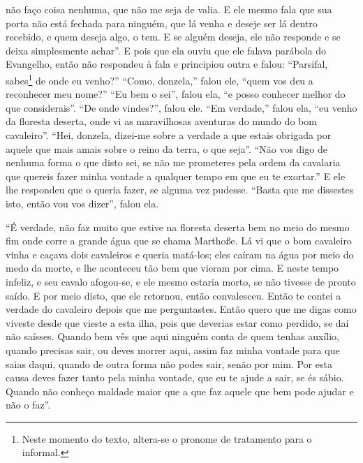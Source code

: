 não faço coisa nenhuma, que não me seja de valia. E ele mesmo fala que sua
porta não está fechada para ninguém, que lá venha e deseje ser lá dentro
recebido, e quem deseja algo, o tem. E se alguém deseja, ele não responde e se
deixa simplesmente achar”. E pois que ela ouviu que ele falava
parábola do Evangelho, então não respondeu à fala e principiou outra e falou:
“Parsifal, sabes\footnote{ Neste momento do texto, altera-se o pronome de
tratamento para o informal.}  de onde eu venho?” “Como, donzela,”
falou ele, “quem vos deu a reconhecer meu nome?” “Eu bem o sei”, falou ela, “e
posso conhecer melhor do que considerais”. “De onde vindes?”, falou ele. “Em
verdade,” falou ela, “eu venho da floresta deserta, onde vi as maravilhosas
aventuras do mundo do bom cavaleiro”. “Hei, donzela, dizei-me sobre a verdade a
que estais obrigada por aquele que mais amais sobre o reino da terra, o que
seja”. “Não vos digo de nenhuma forma o que disto sei, se não me prometeres
pela ordem da cavalaria que quereis fazer minha vontade a qualquer tempo em que
eu te exortar.” E ele lhe respondeu que o queria fazer, se alguma vez pudesse.
“Basta que me dissestes isto, então vou vos dizer”, falou ela.

“É verdade, não faz muito que estive na floresta deserta bem no meio do
mesmo fim onde corre a grande água que se chama Marthoße. Lá vi que o bom
cavaleiro vinha e caçava dois cavaleiros e queria matá-los; eles caíram na água
por meio do medo da morte, e lhe aconteceu tão bem que vieram por cima. E neste
tempo infeliz, e seu cavalo afogou-se, e ele mesmo estaria morto, se não
tivesse de pronto saído. E por meio disto, que ele retornou, então convalesceu.
Então te contei a verdade do cavaleiro depois que me perguntastes. Então quero
que me digas como viveste desde que vieste a esta ilha, pois que deverias estar
como perdido, se daí não saísses. Quando bem vês que aqui ninguém conta de quem
tenhas auxílio, quando precisas sair, ou deves morrer aqui, assim faz minha
vontade para que saias daqui, quando de outra forma não podes sair, senão por
mim. Por esta causa deves fazer tanto pela minha vontade, que eu te ajude a
sair, se és sábio. Quando não conheço maldade maior que a que faz aquele que
bem pode ajudar e não o faz”.

